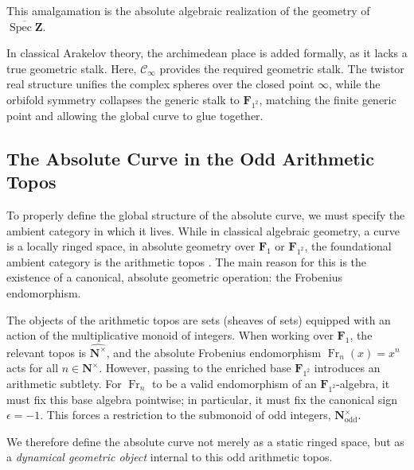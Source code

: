 \documentclass[11pt,a4paper]{article}
\let\mathscr\mathscr
\newcommand{\N}{\mathbf{N}}
\newcommand{\Z}{\mathbf{Z}}
\newcommand{\Fone}{\mathbf{F}_{1}}
\newcommand{\Ftwo}{\mathbf{F}_{1^2}}
\def\spzb{\overline{\Spec \Z}}
\newcommand{\minf}{\mathscr C_\infty}
\newcommand{\frob}{{\operatorname{Fr}}}
\newcommand{\Spec}{\operatorname{Spec}}
\begin{document}
This amalgamation is the absolute algebraic realization of the  geometry of $\spzb$. \vspace{.03in}

In classical Arakelov theory, the archimedean place is added formally, as it lacks a true geometric stalk. Here, $\minf$ provides the required geometric stalk. The twistor real structure unifies the complex spheres over the closed point $\infty$, while the orbifold symmetry collapses the generic stalk to $\Ftwo$,  matching the finite generic point and allowing the global curve to glue together.







\subsection{The Absolute Curve in the Odd Arithmetic Topos}

To properly define the global structure of the absolute curve, we must specify the ambient category in which it lives. While in classical algebraic geometry, a curve is a locally ringed space, in absolute geometry over $\Fone$ or $\Ftwo$, the foundational ambient category is the arithmetic topos . The main reason for this is the existence of a canonical, absolute geometric operation: the Frobenius endomorphism.

The objects of the arithmetic topos are sets (sheaves of sets) equipped with an action of the multiplicative monoid of integers. When working over $\Fone$, the relevant topos is $\widehat{\N^\times}$, and the absolute Frobenius endomorphism $\frob_n(x) = x^n$ acts for all $n \in \N^\times$. However, passing to the enriched base $\Ftwo$ introduces an arithmetic subtlety. For $\frob_n$ to be a valid endomorphism of an $\Ftwo$-algebra, it must fix this base algebra pointwise; in particular, it must fix the canonical sign $\epsilon = -1$. This forces a restriction to the submonoid of odd integers, $\N^\times_{\text{odd}}$.\vspace{.03in}
  

 

We therefore define the absolute curve not merely as a static ringed space, but as a \emph{dynamical geometric object} internal to this odd arithmetic topos.
\end{document}
